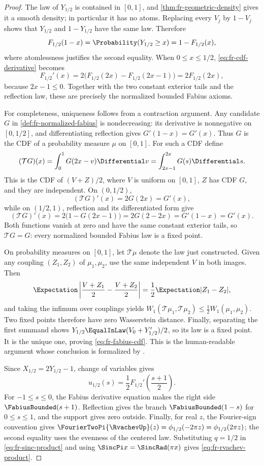 \begin{proof}
The law of \(Y_{1/2}\) is contained in \([0,1]\), and
\cref{thm:fr-geometric-density} gives it a smooth density; in particular it
has no atoms.  Replacing every \(V_j\) by \(1-V_j\) shows that \(Y_{1/2}\)
and \(1-Y_{1/2}\) have the same law.  Therefore
\[
 F_{1/2}(1-x)=\Probability(Y_{1/2}\ge x)=1-F_{1/2}(x),
\]
where atomlessness justifies the second equality.  When
\(0\le x\le1/2\),
\cref{eq:fr-cdf-derivative} becomes
\[
 F_{1/2}'(x)=2\bigl(F_{1/2}(2x)-F_{1/2}(2x-1)\bigr)
 =2F_{1/2}(2x),
\]
because \(2x-1\le0\).  Together with the two constant exterior tails and the
reflection law, these are precisely the normalized bounded Fabius axioms.

For completeness, uniqueness follows from a contraction argument.  Any
candidate \(G\) in \cref{def:fr-normalized-fabius} is nondecreasing: its
derivative is nonnegative on \([0,1/2]\), and differentiating reflection gives
\(G'(1-x)=G'(x)\).  Thus \(G\) is the CDF of a probability measure \(\mu\)
on \([0,1]\).  For such a CDF define
\[
 (\mathcal TG)(x)=\int_0^1G(2x-v)\Differential v
 =\int_{2x-1}^{2x}G(s)\Differential s.
\]
This is the CDF of \((V+Z)/2\), where \(V\) is uniform on \([0,1]\),
\(Z\) has CDF \(G\), and they are independent.  On \((0,1/2)\),
\[
 (\mathcal TG)'(x)=2G(2x)=G'(x),
\]
while on \((1/2,1)\), reflection and its differentiated form give
\[
 (\mathcal TG)'(x)=2\bigl(1-G(2x-1)\bigr)
 =2G(2-2x)=G'(1-x)=G'(x).
\]
Both functions vanish at zero and have the same constant exterior tails, so
\(\mathcal TG=G\): every normalized bounded Fabius law is a fixed point.

On probability measures on \([0,1]\), let \(\mathcal T\mu\) denote the law
just constructed.  Given any coupling \((Z_1,Z_2)\) of \(\mu_1,\mu_2\), use
the same independent \(V\) in both images.  Then
\[
 \Expectation\left|\frac{V+Z_1}{2}-\frac{V+Z_2}{2}\right|
 =\frac12\Expectation|Z_1-Z_2|,
\]
and taking the infimum over couplings yields
\(W_1(\mathcal T\mu_1,\mathcal T\mu_2)
 \le\tfrac12W_1(\mu_1,\mu_2)\).  Two fixed points therefore have zero
Wasserstein distance.  Finally, separating the first summand shows
\(Y_{1/2}\EqualInLaw(V_0+Y_{1/2}')/2\), so its law is a fixed point.  It is
the unique one, proving \cref{eq:fr-fabius-cdf}.  This is the
human-readable argument whose conclusion is formalized by
.

Since \(X_{1/2}=2Y_{1/2}-1\), change of variables gives
\[
 u_{1/2}(s)=\frac12F_{1/2}'\left(\frac{s+1}{2}\right).
\]
For \(-1\le s\le0\), the Fabius derivative equation makes the right side
\(\FabiusBounded(s+1)\).  Reflection gives the branch
\(\FabiusBounded(1-s)\) for \(0\le s\le1\), and
the support gives zero outside.  Finally, for real \(z\), the Fourier-sign
convention gives
\(\FourierTwoPi{\RvachevUp}(z)=\phi_{1/2}(-2\pi z)=\phi_{1/2}(2\pi z)\); the second equality
uses the evenness of the centered law.  Substituting \(q=1/2\) in
\cref{eq:fr-sinc-product} and using
\(\SincPi x=\SincRad(\pi x)\) gives \cref{eq:fr-rvachev-product}.
\end{proof}

